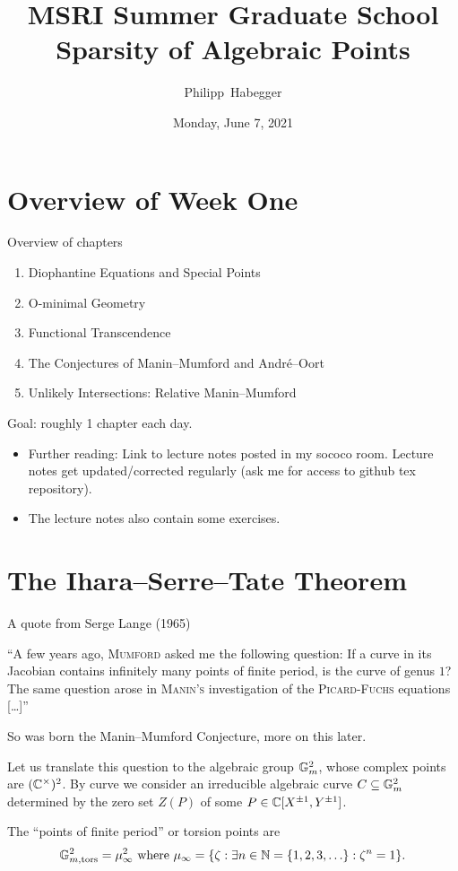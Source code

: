\documentclass{beamer}
\title{MSRI Summer Graduate School \\ Sparsity of Algebraic Points}
\author{Philipp~Habegger}
\date{Monday, June 7, 2021}
\begin{document}
\setlength{\abovecaptionskip}{0pt} 
\setlength{\belowcaptionskip}{0pt} 

\renewcommand{\figurename}{Fig.}


\begin{frame}
  \titlepage
\end{frame}

\section{Overview of Week One}

\begin{frame}{Overview of chapters}
  \begin{enumerate}
  \item Diophantine Equations and Special Points
  \item O-minimal Geometry
  \item Functional Transcendence
  \item The Conjectures of Manin--Mumford and Andr\'e--Oort
  \item Unlikely Intersections: Relative Manin--Mumford
  \end{enumerate}

  Goal: roughly 1 chapter each day.

  \begin{itemize}
  \item   Further reading: Link to \alert{lecture notes} posted in my sococo
    room. Lecture notes get updated/corrected regularly
    (ask me for access to github tex repository).
  \item The lecture notes also contain some exercises.
  \end{itemize}
\end{frame}

\section{The Ihara--Serre--Tate Theorem}

\begin{frame}{A quote from Serge Lange (1965)}
  \bigskip
  
  \begin{displayquote}
    ``A few years ago, \textsc{Mumford} asked me the following question:
    If a curve in its Jacobian contains infinitely many points of finite
    period, is the curve of genus $1$? The same question arose in
    \textsc{Manin's} investigation of the \textsc{Picard-Fuchs}
    equations [\ldots]''
  \end{displayquote}

  So was born the Manin--Mumford Conjecture, more on this later.

  Let us translate this question
  to the \alert{algebraic group} ${\mathbb{G}}_m^2$, whose complex points are
  $({\mathbb{C}}^\times)^2$. By
  curve we consider an irreducible algebraic curve $C\subseteq
  {\mathbb{G}}_m^2$ determined  by the zero set $Z(P)$ of
  some $P\in {\mathbb{C}}[X^{\pm 1},Y^{\pm 1}]$.

  The ``points of finite period'' or  torsion points are
  $$ {\mathbb{G}}_{m,\mathrm{tors}}^2= \mu_\infty^2  \text{ where
  }\mu_\infty = \{\zeta :\exists n\in{\mathbb{N}}=\{1,2,3,\ldots\}: \zeta^n=1 \}.$$
\end{frame}
\end{document}
